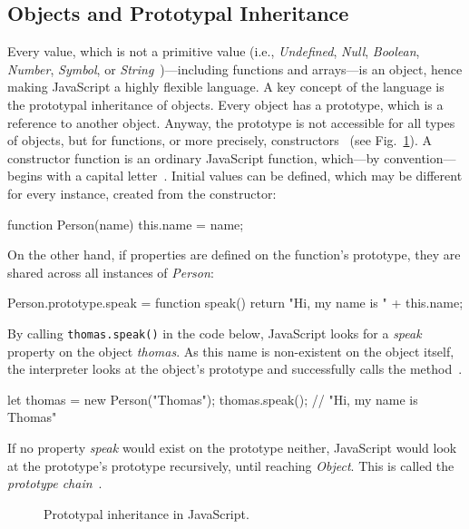 \subsection{Objects and Prototypal Inheritance}
\label{sec:objects-prototypal-inheritance}

Every value, which is not a primitive value (i.e., \emph{Undefined}, \emph{Null}, \emph{Boolean}, \emph{Number}, \emph{Symbol}, or \emph{String}~\cite[p.~5]{ES6Spec:Ecma:2015})---including functions and arrays---is an object, hence making JavaScript a highly flexible language. A key concept of the language is the prototypal inheritance of objects. Every object has a prototype, which is a reference to another object. Anyway, the prototype is not accessible for all types of objects, but for functions, or more precisely, constructors~\cite[p.~3]{ES6Spec:Ecma:2015} (see Fig.~\ref{fig:prototypal-inheritance}).
A constructor function is an ordinary JavaScript function, which---by convention---begins with a capital letter~\cite[p.~8]{JavaScriptObjectProgramming:Rinehart:2015}.
Initial values can be defined, which may be different for every instance, created from the constructor:
\begin{JsCode}[numbers=none]
function Person(name) {
  this.name = name;
}
\end{JsCode}
On the other hand, if properties are defined on the function's prototype, they are shared across all instances of \emph{Person}:
\begin{JsCode}[numbers=none]
Person.prototype.speak = function speak() {
  return "Hi, my name is " + this.name;
}
\end{JsCode}
By calling \texttt{thomas.speak()} in the code below, JavaScript looks for a \emph{speak} property on the object \emph{thomas}. As this name is non-existent on the object itself, the interpreter looks at the object's prototype and successfully calls the method~\cite[pp.~85--86]{YDKJS:ThisAndObjectPrototypes:Simpson:2015}.
\begin{JsCode}[numbers=none]
let thomas = new Person("Thomas");
thomas.speak(); // "Hi, my name is Thomas"
\end{JsCode}
If no property \emph{speak} would exist on the prototype neither, JavaScript would look at the prototype's prototype recursively, until reaching \emph{Object}. This is called the \emph{prototype chain}~\cite[p.~86]{YDKJS:ThisAndObjectPrototypes:Simpson:2015}.

\begin{figure}
\centering

\caption{Prototypal inheritance in JavaScript.}
\label{fig:prototypal-inheritance}
\end{figure}

